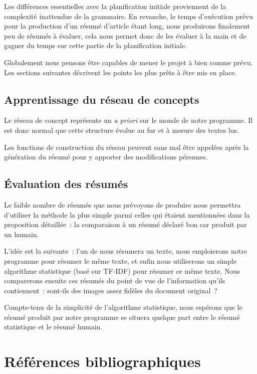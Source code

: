 \documentclass[a4paper, 12pt]{article}
\begin{document}
Les différences essentielles avec la planification initiale proviennent de la complexité inattendue de la grammaire. En revanche, le temps d'exécution prévu pour la production d'un résumé d'article étant long, nous produirons finalement peu de résumés à évaluer, cela nous permet donc de les évaluer à la main et de gagner du temps sur cette partie de la planification initiale.

Globalement nous pensons être capables de mener le projet à bien comme prévu. Les sections suivantes décrivent les points les plus prêts à être mis en place.

\subsection{Apprentissage du réseau de concepts}
Le réseau de concept représente un \textit{a priori} sur le monde de notre programme. Il est donc normal que cette structure évolue au fur et à mesure des textes lus.

Les fonctions de construction du réseau peuvent sans mal être appelées après la génération du résumé pour y apporter des modifications pérennes.

\subsection{\'Evaluation des résumés}
Le faible nombre de résumés que nous prévoyons de produire nous permettra d'utiliser la méthode la plus simple parmi celles qui étaient mentionnées dans la proposition détaillée~: la comparaison à un résumé déclaré bon car produit par un humain.

L'idée est la suivante~: l'un de nous résumera un texte, nous emploierons notre programme pour résumer le même texte, et enfin nous utiliserons un simple algorithme statistique (basé sur TF-IDF) pour résumer ce même texte. Nous comparerons ensuite ces résumés du point de vue de l'information qu'ils contiennent~: sont-ils des images assez fidèles du document original~?

Compte-tenu de la simplicité de l'algorithme statistique, nous espérons que le résumé produit par notre programme se situera quelque part entre le résumé statistique et le résumé humain.

\section{Références bibliographiques}

\nocite{*}
\printbibliography{}

\appendix

\printindex
\end{document}
